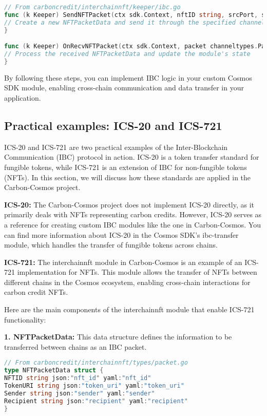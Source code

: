 \documentclass{article}
\begin{document}
\begin{lstlisting}[language=Go]
// From carboncredit/interchainnft/keeper/ibc.go
func (k Keeper) SendNFTPacket(ctx sdk.Context, nftID string, srcPort, srcChannel string, timeoutHeight clienttypes.Height, timeoutTimestamp uint64, nft types.BaseNFT) error {
// Create a new NFTPacketData and send it through the specified channel
}

func (k Keeper) OnRecvNFTPacket(ctx sdk.Context, packet channeltypes.Packet, data types.NFTPacketData) error {
// Process the received NFTPacketData and update the module's state
}
\end{lstlisting}

By following these steps, you can implement IBC logic in your custom Cosmos SDK module, enabling cross-chain communication and data transfer in your application.

\subsection{Practical examples: ICS-20 and ICS-721}

ICS-20 and ICS-721 are two practical examples of the Inter-Blockchain Communication (IBC) protocol in action. ICS-20 is a token transfer standard for fungible tokens, while ICS-721 is an extension of IBC for non-fungible tokens (NFTs). In this section, we will discuss how these standards are applied in the Carbon-Cosmos project.

\textbf{ICS-20:} The Carbon-Cosmos project does not implement ICS-20 directly, as it primarily deals with NFTs representing carbon credits. However, ICS-20 serves as a reference for creating custom IBC modules like the one in Carbon-Cosmos. You can find more information about ICS-20 in the Cosmos SDK's ibc-transfer module, which handles the transfer of fungible tokens across chains.

\textbf{ICS-721:} The interchainnft module in Carbon-Cosmos is an example of an ICS-721 implementation for NFTs. This module allows the transfer of NFTs between different chains in the Cosmos ecosystem, enabling cross-chain interactions for carbon credit NFTs.

Here are the main components of the interchainnft module that enable ICS-721 functionality:

\textbf{1. NFTPacketData:} This data structure defines the information to be transferred between chains as an IBC packet.

\begin{lstlisting}[language=Go]
// From carboncredit/interchainnft/types/packet.go
type NFTPacketData struct {
NFTID string json:"nft_id" yaml:"nft_id"
TokenURI string json:"token_uri" yaml:"token_uri"
Sender string json:"sender" yaml:"sender"
Recipient string json:"recipient" yaml:"recipient"
}
\end{lstlisting}
\end{document}
